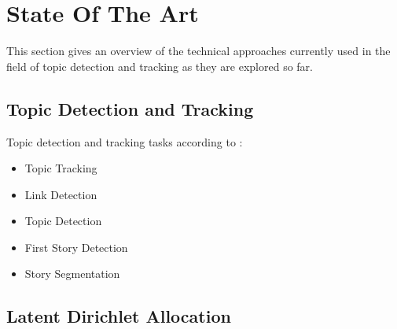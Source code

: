 
\section{State Of The Art}\label{sec:SOTA}

This section gives an overview of the technical approaches currently used in the field of topic detection and tracking as they are explored so far.

\subsection{Topic Detection and Tracking}\label{sec:TDT}
Topic detection and tracking tasks according to \cite{Fiscus:2002:TDT:772260.772263} :
\begin{itemize}
	\item Topic Tracking
	\item Link Detection
	\item Topic Detection
	\item First Story Detection
	\item Story Segmentation
\end{itemize}

\subsection{Latent Dirichlet Allocation}\label{sec:LDA}

